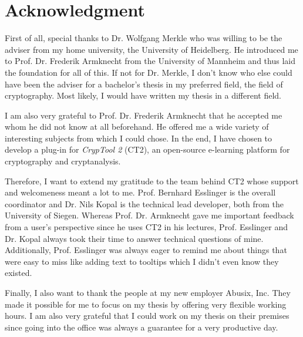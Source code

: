 
\section*{Acknowledgment}

First of all, special thanks to Dr. Wolfgang Merkle who was willing to be the adviser from my home university, the University of Heidelberg. He introduced me to Prof. Dr. Frederik Armknecht from the University of Mannheim and thus laid the foundation for all of this. If not for Dr. Merkle, I don't know who else could have been the adviser for a bachelor's thesis in my preferred field, the field of cryptography. Most likely, I would have written my thesis in a different field.

\medskip
\noindent
I am also very grateful to Prof. Dr. Frederik Armknecht that he accepted me whom he did not know at all beforehand. He offered me a wide variety of interesting subjects from which I could chose. In the end, I have chosen to develop a plug-in for \textit{CrypTool 2} (CT2), an open-source e-learning platform for cryptography and cryptanalysis.

\medskip
\noindent
Therefore, I want to extend my gratitude to the team behind CT2 whose support and welcomeness meant a lot to me. Prof. Bernhard Esslinger is the overall coordinator and Dr. Nils Kopal is the technical lead developer, both from the University of Siegen.
Whereas Prof. Dr. Armknecht gave me important feedback from a user's perspective since he uses CT2 in his lectures, Prof. Esslinger and Dr. Kopal always took their time to answer technical questions of mine. Additionally, Prof. Esslinger was always eager to remind me about things that were easy to miss like adding text to tooltips which I didn't even know they existed. 

\medskip
\noindent
Finally, I also want to thank the people at my new employer Abusix, Inc. They made it possible for me to focus on my thesis by offering very flexible working hours. I am also very grateful that I could work on my thesis on their premises since going into the office was always a guarantee for a very productive day.
